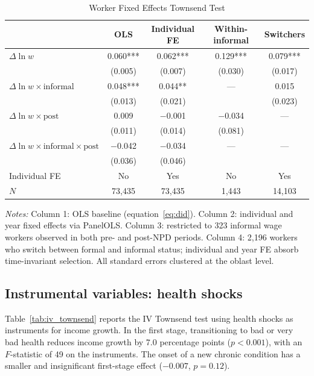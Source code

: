 \documentclass[12pt]{article}
\begin{document}
\begin{table}[htbp]
\centering
\caption{Worker Fixed Effects Townsend Test}
\label{tab:worker_fe}
\small
\begin{tabular}{lcccc}
\toprule
 & OLS & Individual FE & Within-informal & Switchers \\
\midrule
$\Delta \ln w$ & 0.060*** & 0.062*** & 0.129*** & 0.079*** \\
 & (0.005) & (0.007) & (0.030) & (0.017) \\[4pt]
$\Delta \ln w \times \text{informal}$ & 0.048*** & 0.044** & --- & 0.015 \\
 & (0.013) & (0.021) & & (0.023) \\[4pt]
$\Delta \ln w \times \text{post}$ & 0.009 & $-$0.001 & $-$0.034 & --- \\
 & (0.011) & (0.014) & (0.081) & \\[4pt]
$\Delta \ln w \times \text{informal} \times \text{post}$ & $-$0.042 & $-$0.034 & --- & --- \\
 & (0.036) & (0.046) & & \\[4pt]
Individual FE & No & Yes & No & Yes \\
$N$ & 73,435 & 73,435 & 1,443 & 14,103 \\
\bottomrule
\end{tabular}
\begin{minipage}{0.9\textwidth}
\vspace{0.3em}
\footnotesize \textit{Notes:} Column 1: OLS baseline (equation~\ref{eq:did}). Column 2: individual and year fixed effects via PanelOLS. Column 3: restricted to 323 informal wage workers observed in both pre- and post-NPD periods. Column 4: 2,196 workers who switch between formal and informal status; individual and year FE absorb time-invariant selection. All standard errors clustered at the oblast level.
\end{minipage}
\end{table}

\subsection{Instrumental variables: health shocks}

Table~\ref{tab:iv_townsend} reports the IV Townsend test using health shocks as instruments for income growth. In the first stage, transitioning to bad or very bad health reduces income growth by 7.0 percentage points ($p < 0.001$), with an $F$-statistic of 49 on the instruments. The onset of a new chronic condition has a smaller and insignificant first-stage effect ($-0.007$, $p = 0.12$).
\end{document}
